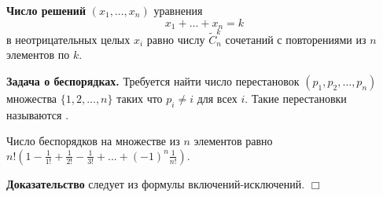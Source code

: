 \textbf{Число решений} $\left(x_1, \ldots, x_n\right)$ уравнения 
$$x_1+ \ldots + x_n=k$$
в неотрицательных целых $x_i$
равно числу $\widetilde{C}_n^k$ сочетаний с повторениями из $n$ элементов по $k$.
\bigskip

\textbf{Задача о беспорядках.}
Требуется найти число перестановок $(p_1, p_2, \ldots, p_n)$ множества $\{1, 2, \ldots , n\}$ таких что $p_i \neq i$ для всех $i$. Такие перестановки называются .

\begin{theorem}
	Число беспорядков на множестве из $n$ элементов равно
	$n!\left(1-\frac{1}{1!}+\frac{1}{2!}-\frac{1}{3!}+ ... +(-1)^n\frac{1}{n!}\right).$
\end{theorem}
\textbf{Доказательство} следует из формулы включений-исключений. $\Box$

